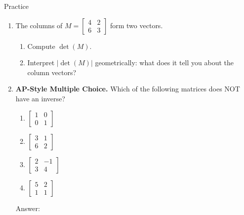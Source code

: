 \documentclass[10pt]{article}
\begin{document}
\begin{notesbox}{Practice}
\begin{enumerate}[leftmargin=1.5em, itemsep=6pt]
    \vspace{0.05in}

    \item The columns of $M = \begin{bmatrix}4&2\\6&3\end{bmatrix}$ form two vectors.
    \begin{enumerate}[label=(\alph*), leftmargin=1.5em, itemsep=10pt]
        \item Compute $\det(M)$.

        \vspace{4pt}

        \item Interpret $|\det(M)|$ geometrically: what does it tell you about the column vectors?

    \end{enumerate}

    \item \textbf{AP-Style Multiple Choice.} Which of the following matrices does NOT have an
          inverse?
    \begin{enumerate}[label=(\Alph*), leftmargin=2em, itemsep=4pt]
        \item $\begin{bmatrix}1&0\\0&1\end{bmatrix}$
        \item $\begin{bmatrix}3&1\\6&2\end{bmatrix}$
        \item $\begin{bmatrix}2&-1\\3&4\end{bmatrix}$
        \item $\begin{bmatrix}5&2\\1&1\end{bmatrix}$
    \end{enumerate}

    \vspace{4pt}
    Answer:  \quad

\end{enumerate}
\end{notesbox}
\end{document}
